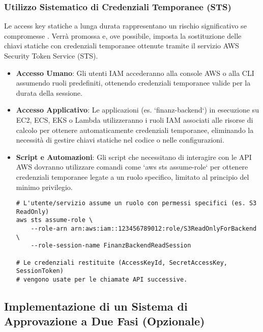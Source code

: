 \subsubsection{Utilizzo Sistematico di Credenziali Temporanee (STS)}

Le access key statiche a lunga durata rappresentano un rischio significativo se compromesse \cite{kazi:leastprivilege}. Verrà promossa e, ove possibile, imposta la sostituzione delle chiavi statiche con credenziali temporanee ottenute tramite il servizio AWS Security Token Service (STS).
\begin{itemize}
    \item \textbf{Accesso Umano}: Gli utenti IAM accederanno alla console AWS o alla CLI assumendo ruoli predefiniti, ottenendo credenziali temporanee valide per la durata della sessione.
    \item \textbf{Accesso Applicativo}: Le applicazioni (es. `finanz-backend`) in esecuzione su EC2, ECS, EKS o Lambda utilizzeranno i ruoli IAM associati alle risorse di calcolo per ottenere automaticamente credenziali temporanee, eliminando la necessità di gestire chiavi statiche nel codice o nelle configurazioni.
    \item \textbf{Script e Automazioni}: Gli script che necessitano di interagire con le API AWS dovranno utilizzare comandi come `aws sts assume-role` per ottenere credenziali temporanee legate a un ruolo specifico, limitato al principio del minimo privilegio.
    \begin{lstlisting}[style=bash, caption={Ottenere credenziali temporanee tramite STS AssumeRole}, label=lst:sts-assume-role]
# L'utente/servizio assume un ruolo con permessi specifici (es. S3 ReadOnly)
aws sts assume-role \
    --role-arn arn:aws:iam::123456789012:role/S3ReadOnlyForBackend \
    --role-session-name FinanzBackendReadSession
    
# Le credenziali restituite (AccessKeyId, SecretAccessKey, SessionToken)
# vengono usate per le chiamate API successive.
    \end{lstlisting}
\end{itemize}

\subsection{Implementazione di un Sistema di Approvazione a Due Fasi (Opzionale)}


